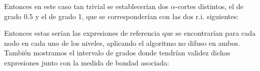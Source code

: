 \documentclass[10pt,a4paper]{article}
\begin{document}
Entonces en este caso tan trivial se establecerían dos $\alpha$-cortes distintos, el de grado 0.5 y el de grado 1, que se corresponderían con las dos r.i. siguientes:\\

\begin{figure}[H]
\end{figure}

Entonces estas serían las expresiones de referencia que se encontrarían para cada nodo en cada uno de los niveles, aplicando el algoritmo no difuso en ambos. También mostramos el intervalo de grados donde tendrían validez dichas expresiones junto con la medida de bondad asociada:
\end{document}
